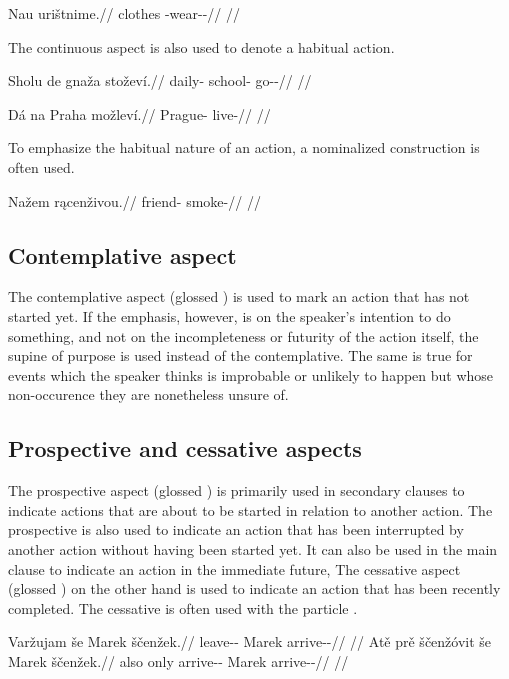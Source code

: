 \pex
\begingl
\gla Nau urištnime.//
\glb clothes \Refl{}-wear-\Pv{}-\Prog{}//
\glft {} //
\endgl
\xe

The continuous aspect is also used to denote a habitual action.

\pex
\begingl
\gla Sholu de gnaža stoževí.//
\glb daily-\Ins{}  school-\Acc{} go-\Av{}-\Cont{}//
\glft {} //
\endgl
\xe

\pex
\begingl
\gla Dá na Praha možleví.//
\glb \First{}\Sg{} \Loc{} Prague-\Acc{} live-\Cont{}//
\glft {} //
\endgl
\xe

To emphasize the habitual nature of an action, a nominalized construction is
often used.

\pex
\begingl
\gla Nažem rącenživou.//
\glb friend-\First{}\Sg{} smoke-//
\glft {} //
\endgl
\xe

\subsection{Contemplative aspect}

The contemplative aspect (glossed \Ctp{}) is used to mark an action that has not
started yet. If the emphasis, however, is on the speaker's intention to do
something, and not on the incompleteness or futurity of the action itself, the
supine of purpose is used instead of the contemplative. The same is true for
events which the speaker thinks is improbable or unlikely to happen but whose
non-occurence they are nonetheless unsure of.

\subsection{Prospective and cessative aspects}

The prospective aspect (glossed \Prosp{}) is primarily used in secondary clauses
to indicate actions that are about to be started in relation to another action.
The prospective is also used to indicate an action that has been interrupted by
another action without having been started yet. It can also be used in the main
clause to indicate an action in the immediate future, The cessative aspect
(glossed \Ces{}) on the other hand is used to indicate an action that has been
recently completed. The cessative is often used with the particle
.

\pex
\a\begingl
\gla Varžujam še Marek ščenžek.//
\glb leave-\Av{}-\Prosp{} \Com{} Marek arrive-\Av{}-\Pf{}//
\glft {} //
\endgl
\a\begingl
\gla Atě prě ščenžóvit še Marek ščenžek.//
\glb also only arrive-\Av{}-\Ces{} \Com{} Marek arrive-\Av{}-\Pf{}//
\glft {} //
\endgl
\xe

